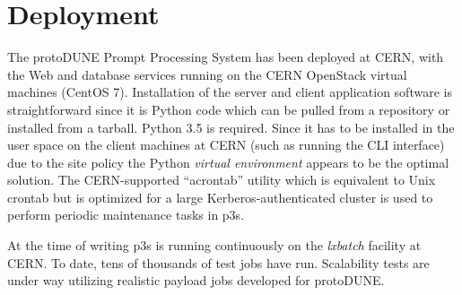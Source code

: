 \documentclass{PoS}
\newcommand{\pd}{protoDUNE\xspace}
\begin{document}
\section{Deployment}
The \pd Prompt Processing System has been deployed at CERN, with the Web and database services running
on the CERN OpenStack virtual machines (CentOS 7). Installation of the server and client application
software is straightforward since it is Python code which can be pulled from a repository or installed from a tarball.
Python 3.5 is required.
Since it has to be installed in the user space on the client machines  at CERN (such as running the CLI interface)
due to the site policy the Python \textit{virtual environment} appears to be the optimal solution. The CERN-supported
``acrontab'' utility which is equivalent to Unix crontab but is optimized for a large Kerberos-authenticated cluster
is used to perform periodic maintenance tasks in p3s.

At the time of writing p3s is running continuously on the \textit{lxbatch} facility at CERN. To date, tens of thousands of test jobs have run.
Scalability tests are under way utilizing realistic payload jobs developed for \pd.
\end{document}
